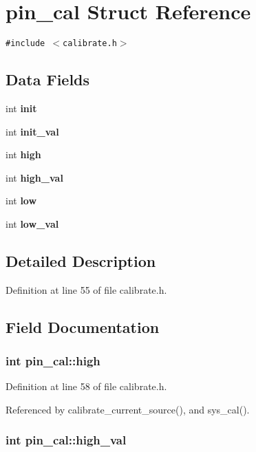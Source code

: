 \section{pin\_\-cal Struct Reference}
\label{structpin__cal}
{\tt \#include $<$calibrate.h$>$}

\subsection*{Data Fields}
\begin{CompactItemize}
\item 
int {\bf init}
\item 
int {\bf init\_\-val}
\item 
int {\bf high}
\item 
int {\bf high\_\-val}
\item 
int {\bf low}
\item 
int {\bf low\_\-val}
\end{CompactItemize}


\subsection{Detailed Description}




Definition at line 55 of file calibrate.h.

\subsection{Field Documentation}
\subsubsection{\setlength{\rightskip}{0pt plus 5cm}int {\bf pin\_\-cal::high}}\label{structpin__cal_o2}




Definition at line 58 of file calibrate.h.

Referenced by calibrate\_\-current\_\-source(), and sys\_\-cal().
\subsubsection{\setlength{\rightskip}{0pt plus 5cm}int {\bf pin\_\-cal::high\_\-val}}\label{structpin__cal_o3}




